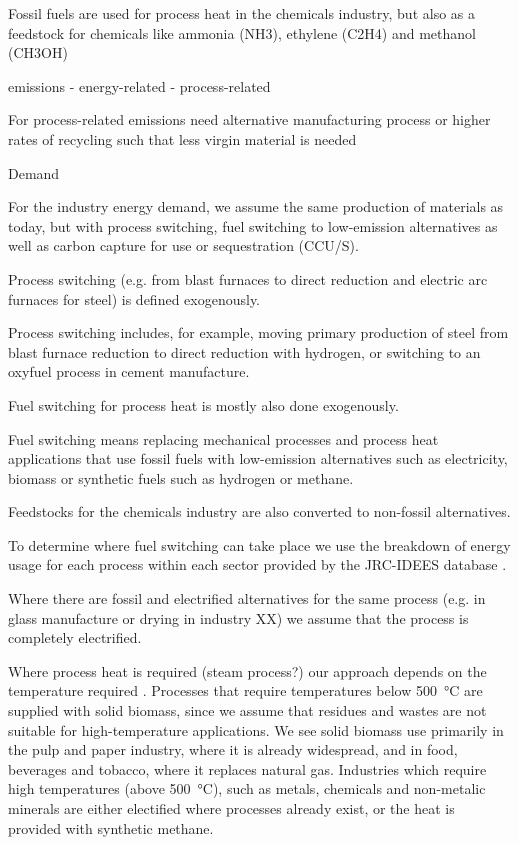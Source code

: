 Fossil fuels are used for process heat in the chemicals industry, but also as a feedstock for chemicals like
ammonia (NH3), ethylene (C2H4) and methanol (CH3OH)

emissions
- energy-related
- process-related

For process-related emissions need alternative manufacturing process
or higher rates of recycling such that less virgin material is needed

Demand

For the industry energy demand, we assume the same
production of materials as today, but with process switching, fuel switching to
low-emission alternatives as well as carbon capture for use or sequestration
(CCU/S).

Process switching (e.g. from blast furnaces to direct reduction and electric arc
furnaces for steel) is defined exogenously.

Process switching includes, for example, moving primary production of
steel from blast furnace reduction to direct reduction with hydrogen, or
switching to an oxyfuel process in cement manufacture.

Fuel switching for process heat is mostly also done exogenously.

Fuel switching means
replacing mechanical processes and process heat applications that use fossil
fuels with low-emission alternatives such as electricity, biomass or synthetic
fuels such as hydrogen or methane.

Feedstocks for the chemicals industry are
also converted to non-fossil alternatives.

To determine where fuel switching can take place we use the breakdown of energy
usage for each process within each sector provided by the JRC-IDEES database
.

Where there are fossil and electrified alternatives for the same
process (e.g. in glass manufacture or drying in industry XX) we assume that the
process is completely electrified.

Where process heat is required (steam
process?) our approach depends on the temperature required
. Processes that require temperatures below
\SI{500}{\celsius} are supplied with solid biomass, since we assume that residues and
wastes are not suitable for high-temperature applications. We see solid biomass
use primarily in the pulp and paper industry, where it is already widespread,
and in food, beverages and tobacco, where it replaces natural gas. Industries
which require high temperatures (above \SI{500}{\celsius}), such as metals, chemicals
and non-metalic minerals are either electified where processes already exist, or
the heat is provided with synthetic methane.

